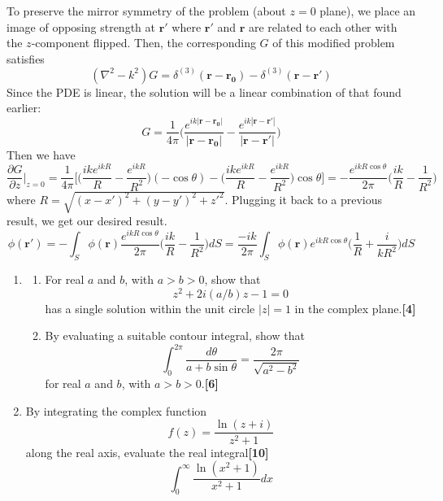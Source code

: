 \documentclass[a4paper]{article}
\begin{document}
\begin{ans}
\begin{enumerate}[label=(\roman*)]
\begin{enumerate}[label=(\alph*)]
To preserve the mirror symmetry of the problem (about $z=0$ plane), we place an image of opposing strength at $\mathbf{r'}$ where $\mathbf{r'}$ and $\mathbf{r}$ are related to each other with the $z$-component flipped. Then, the corresponding $G$ of this modified problem satisfies
$$(\nabla^2-k^2)G=\delta^{(3)}(\mathbf{r}-\mathbf{r_0})-\delta^{(3)}(\mathbf{r}-\mathbf{r'})$$
Since the PDE is linear, the solution will be a linear combination of that found earlier:
$$G=\frac{1}{4\pi}\bigg(\frac{e^{ik|\mathbf{r}-\mathbf{r_0}|}}{|\mathbf{r}-\mathbf{r_0}|}-\frac{e^{ik|\mathbf{r}-\mathbf{r'}|}}{|\mathbf{r}-\mathbf{r'}|}\bigg)$$
Then we have
$$\frac{\partial G}{\partial z}\bigg|_{z=0}=\frac{1}{4\pi}\bigg[\bigg(\frac{ike^{ikR}}{R}-\frac{e^{ikR}}{R^2}\bigg)(-\cos\theta)-\bigg(\frac{ike^{ikR}}{R}-\frac{e^{ikR}}{R^2}\bigg)\cos\theta\bigg]=-\frac{e^{ikR\cos\theta}}{2\pi}\bigg(\frac{ik}{R}-\frac{1}{R^2}\bigg)$$
where $R=\sqrt{(x-x')^2+(y-y')^2+z'^2}$. Plugging it back to a previous result, we get our desired result.
$$\phi(\mathbf{r'})=-\int_S\phi(\mathbf{r})\frac{e^{ikR\cos\theta}}{2\pi}\bigg(\frac{ik}{R}-\frac{1}{R^2}\bigg)dS=\frac{-ik}{2\pi}\int_S\phi(\mathbf{r})e^{ikR\cos\theta}\bigg(\frac{1}{R}+\frac{i}{kR^2}\bigg)dS$$
\end{enumerate}
\end{enumerate}
\end{ans}
\newpage
\begin{qns}\leavevmode
\begin{enumerate}[label=(\roman*)]
\item 
\begin{enumerate}[label=(\alph*)]
\item For real $a$ and $b$, with $a > b > 0$, show that
$$z^2 + 2i(a/b)z − 1 = 0$$
has a single solution within the unit circle $|z| = 1$ in the complex plane.\hfill\textbf{[4]}
\item By evaluating a suitable contour integral, show that
$$\int_0^{2\pi}\frac{d\theta}{a+b\sin\theta}=\frac{2\pi}{\sqrt{a^2-b^2}}$$
for real $a$ and $b$, with $a > b > 0$.\hfill\textbf{[6]}
\end{enumerate}
\item By integrating the complex function
$$f(z)=\frac{\ln(z+i)}{z^2+1}$$
along the real axis, evaluate the real integral\hfill\textbf{[10]}
$$\int_0^\infty\frac{\ln(x^2+1)}{x^2+1}dx$$
\end{enumerate}
\end{qns}
\end{document}
